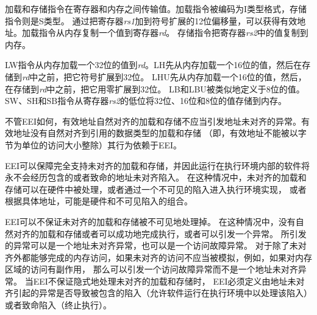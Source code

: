 加载和存储指令在寄存器和内存之间传输值。加载指令被编码为I类型格式，存储指令则是S类型。
通过把寄存器{\em rs1}加到符号扩展的12位偏移量，可以获得有效地址。加载指令从内存复制一个值到寄存器{\em rd}。
存储指令把寄存器{\em rs2}中的值复制到内存。

LW指令从内存加载一个32位的值到{\em rd}。LH先从内存加载一个16位的值，然后在存储到{\em rd}中之前，把它符号扩展到32位。
LHU先从内存加载一个16位的值，然后，在存储到{\em rd}中之前，把它用零扩展到32位。
LB和LBU被类似地定义于8位的值。SW、SH和SB指令从寄存器{\em rs2}的低位将32位、16位和8位的值存储到内存。

不管EEI如何，有效地址自然对齐的加载和存储不应当引发地址未对齐的异常。有效地址没有自然对齐到引用的数据类型的加载和存储
（即，有效地址不能被以字节为单位的访问大小整除）其行为依赖于EEI。

EEI可以保障完全支持未对齐的加载和存储，并因此运行在执行环境内部的软件将永不会经历包含的或者致命的地址未对齐陷入。
在这种情况中，未对齐的加载和存储可以在硬件中被处理，或者通过一个不可见的陷入进入执行环境实现，
或者根据具体地址，可能是硬件和不可见陷入的组合。

EEI可以不保证未对齐的加载和存储被不可见地处理掉。
在这种情况中，没有自然对齐的加载和存储或者可以成功地完成执行，或者可以引发一个异常。
所引发的异常可以是一个地址未对齐异常，也可以是一个访问故障异常。
对于除了未对齐外都能够完成的内存访问，如果未对齐的访问不应当被模拟，例如，如果对内存区域的访问有副作用，
那么可以引发一个访问故障异常而不是一个地址未对齐异常。
当EEI不保证隐式地处理未对齐的加载和存储时，
EEI必须定义由地址未对齐引起的异常是否导致被包含的陷入（允许软件运行在执行环境中以处理该陷入）或者致命陷入（终止执行）。

